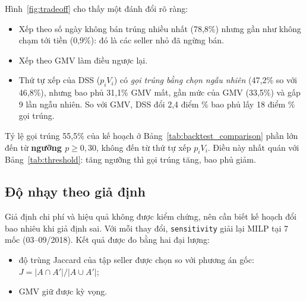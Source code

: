 Hình~\ref{fig:tradeoff} cho thấy một đánh đổi rõ ràng:
\begin{itemize}
    \item Xếp theo số ngày không bán trúng nhiều nhất (78,8\%) nhưng gần như không chạm tới tiền (0,9\%): đó là các seller nhỏ đã ngừng bán.
    \item Xếp theo GMV làm điều ngược lại.
    \item Thứ tự xếp của DSS ($p_i V_i$) có \emph{gọi trúng bằng chọn ngẫu nhiên} (47,2\% so với 46,8\%), nhưng bao phủ 31,1\% GMV mất, gần mức của GMV (33,5\%) và gấp 9 lần ngẫu nhiên. So với GMV, DSS đổi 2,4 điểm \% bao phủ lấy 18 điểm \% gọi trúng.
\end{itemize}
Tỷ lệ gọi trúng 55,5\% của kế hoạch ở Bảng~\ref{tab:backtest_comparison} phần lớn đến từ \textbf{ngưỡng $p \ge 0{,}30$}, không đến từ thứ tự xếp $p_i V_i$. Điều này nhất quán với Bảng~\ref{tab:threshold}: tăng ngưỡng thì gọi trúng tăng, bao phủ giảm.

\subsection{Độ nhạy theo giả định}
\label{sec:sens}
Giả định chi phí và hiệu quả không được kiểm chứng, nên cần biết kế hoạch đổi bao nhiêu khi giả định sai. Với mỗi thay đổi, \texttt{sensitivity} giải lại MILP tại 7 mốc (03--09/2018). Kết quả được đo bằng hai đại lượng:
\begin{itemize}
    \item độ trùng Jaccard của tập seller được chọn so với phương án gốc: $J = |A \cap A'| / |A \cup A'|$;
    \item GMV giữ được kỳ vọng.
\end{itemize}

